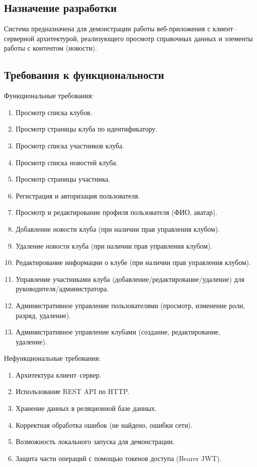 \documentclass[utf8, russian]{eskdtext}
\begin{document}
\subsection{Назначение разработки}
Система предназначена для демонстрации работы веб-приложения с клиент--серверной архитектурой, реализующего просмотр справочных данных и элементы работы с контентом (новости).

\subsection{Требования к функциональности}
Функциональные требования:
\begin{enumerate}
  \item Просмотр списка клубов.
  \item Просмотр страницы клуба по идентификатору.
  \item Просмотр списка участников клуба.
  \item Просмотр списка новостей клуба.
  \item Просмотр страницы участника.
  \item Регистрация и авторизация пользователя.
  \item Просмотр и редактирование профиля пользователя (ФИО, аватар).
  \item Добавление новости клуба (при наличии прав управления клубом).
  \item Удаление новости клуба (при наличии прав управления клубом).
  \item Редактирование информации о клубе (при наличии прав управления клубом).
  \item Управление участниками клуба (добавление/редактирование/удаление) для руководителя/администратора.
  \item Административное управление пользователями (просмотр, изменение роли, разряд, удаление).
  \item Административное управление клубами (создание, редактирование, удаление).
\end{enumerate}

Нефункциональные требования:
\begin{enumerate}
  \item Архитектура клиент--сервер.
  \item Использование REST API по HTTP.
  \item Хранение данных в реляционной базе данных.
  \item Корректная обработка ошибок (не найдено, ошибки сети).
  \item Возможность локального запуска для демонстрации.
  \item Защита части операций с помощью токенов доступа (Bearer JWT).
\end{enumerate}
\end{document}
